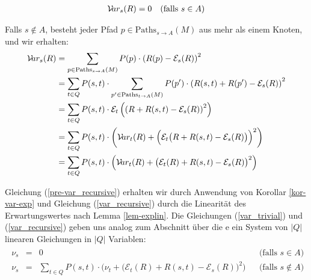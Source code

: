 \documentclass[a4paper]{article}
\theoremstyle{nonumberplain}
\begin{document}
	\begin{align}
	\mathcal{V}\!ar_{s}(R) = 0 && \text{(falls $s \in A$)}\label{var_trivial}
	\end{align}
	
	Falls $s \notin A$, besteht jeder Pfad $p \in \mathrm{Paths}_{s \rightarrow A}(M)$ aus mehr als einem Knoten, und wir erhalten:
	\begin{align}
	\mathcal{V}\!ar_{s}(R) & = \sum_{p \in \mathrm{Paths}_{s \rightarrow A}(M)}{P(p) \cdot \left(R(p) - \mathcal{E}_{s}(R)\right)^2} \\
	& = \sum_{t \in Q}{ P(s,t) \cdot \sum_{p' \in \mathrm{Paths}_{t \rightarrow A}(M)}{ P(p') \cdot \left(R(s,t) + R(p') - \mathcal{E}_{s}(R)\right)^2 } } \\
	& = \sum_{t \in Q}{ P(s,t) \cdot \mathcal{E}_{t}\left(\left(R + R(s,t) - \mathcal{E}_{s}(R)\right)^2\right) } \\
	& = \sum_{t \in Q}{ P(s,t) \cdot \bigg(\mathcal{V}\!ar_{t}(R) + \Big(\mathcal{E}_{t}\big(R + R(s,t) - \mathcal{E}_{s}(R)\big)\Big)^2\bigg) } \label{pre-var_recursive} \\
	& = \sum_{t \in Q}{ P(s,t) \cdot \Big(\mathcal{V}\!ar_{t}(R) + \big(\mathcal{E}_{t}(R) + R(s,t) - \mathcal{E}_{s}(R)\big)^2\Big) } \label{var_recursive}
	\end{align}
	
	Gleichung (\ref{pre-var_recursive}) erhalten wir durch Anwendung von Korollar \ref{kor-var-exp} und Gleichung (\ref{var_recursive}) durch die Linearität des Erwartungswertes nach Lemma \ref{lem-explin}.
	Die Gleichungen (\ref{var_trivial}) und (\ref{var_recursive}) geben uns analog zum Abschnitt über die \expect{}e ein System von $|Q|$ linearen Gleichungen in $|Q|$ Variablen:
	\begin{align}
	\begin{aligned}
	\nu_s & = & 0 && \text{(falls $s \in A$)}\\
	\nu_s & = & \sum_{t \in Q}{ P(s,t) \cdot \Big(\nu_t + \big(\mathcal{E}_{t}(R) + R(s,t) - \mathcal{E}_{s}(R)\big)^2\Big) } && \text{(falls $s \notin A$)}
	\end{aligned}\label{les-var}
	\end{align}
	
\end{document}
